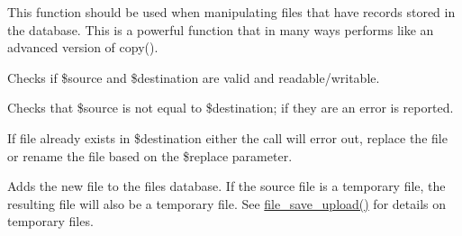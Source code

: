 This function should be used when manipulating files that have records stored in the database. This is a powerful function that in many ways performs like an advanced version of copy().
\begin{DoxyItemize}
\item Checks if \$source and \$destination are valid and readable/writable.
\item Checks that \$source is not equal to \$destination; if they are an error is reported.
\item If file already exists in \$destination either the call will error out, replace the file or rename the file based on the \$replace parameter.
\item Adds the new file to the files database. If the source file is a temporary file, the resulting file will also be a temporary file. See \hyperlink{group__file_gaec0ce0fef696b3d4f9e0809c84bd8f41}{file\_\-save\_\-upload()} for details on temporary files.
\end{DoxyItemize}


